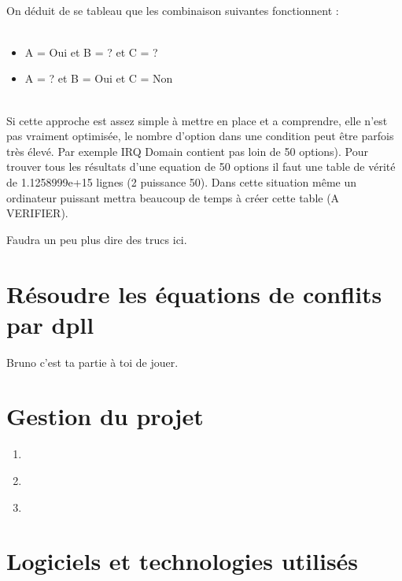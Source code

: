 \documentclass[16pts]{report}
\begin{document}
\\

On déduit de se tableau que les combinaison suivantes fonctionnent : \\

\\

\begin{itemize}
\item A = Oui et B = ?   et C = ?   \\
\item A = ?   et B = Oui et C = Non \\
\end{itemize}

\\

Si cette approche est assez simple à mettre en place et a comprendre, 
elle n'est pas vraiment optimisée, le nombre d'option dans une condition
peut être parfois très élevé. Par exemple IRQ Domain contient pas loin de 
50 options).
Pour trouver tous les résultats d'une equation de 50 options il faut une table
de vérité de 1.1258999e+15 lignes (2 puissance 50). Dans cette situation même un ordinateur
puissant mettra beaucoup de temps à créer cette table (A VERIFIER).

Faudra un peu plus dire des trucs ici.

\section{Résoudre les équations de conflits par dpll}
\label{sec:Résoudre les équations de conflits par dpll}

Bruno c'est ta partie à toi de jouer.

\section{Gestion du projet}
\label{sec:Gestion du projet}

\begin{enumerate}
	\item 

	\item 
	\\

	\item 



\end{enumerate}

\section{Logiciels et technologies utilisés}
\label{sec:Logiciels et technologies utilisés}
\end{document}
